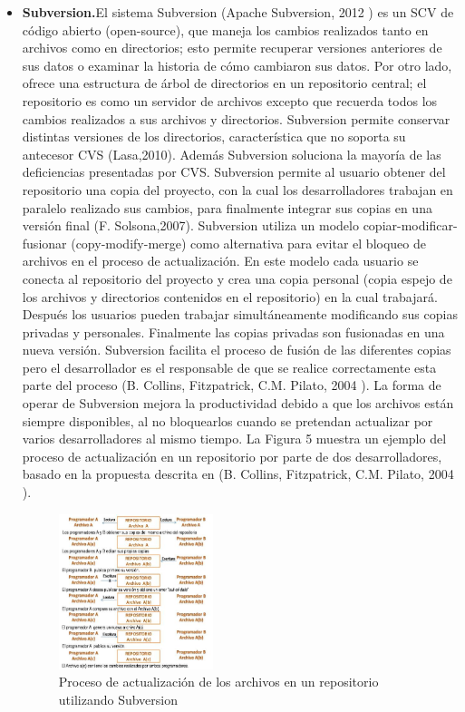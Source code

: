 \documentclass[a4paper,12pt]{article}
\begin{document}
{\begin{itemize}
\begin{figure}[h]
	\end{figure}
	
	\item \textbf{Subversion.}El sistema Subversion (Apache Subversion, 2012 ) es un SCV de código abierto (open-source), que maneja los
	cambios realizados tanto en archivos como en directorios; esto permite recuperar versiones
	anteriores de sus datos o examinar la historia de cómo cambiaron sus datos. Por otro lado, ofrece una estructura de árbol de directorios en un repositorio central; el repositorio es como un servidor de archivos excepto que recuerda todos los cambios realizados a sus archivos y directorios. Subversion permite conservar distintas versiones de
	los directorios, característica que no soporta su antecesor CVS (Lasa,2010). Además Subversion soluciona la mayoría de las deficiencias presentadas por CVS. Subversion permite al usuario obtener del repositorio una copia del proyecto, con la cual los desarrolladores trabajan en paralelo realizado sus cambios, para finalmente integrar sus copias en una versión final (F. Solsona,2007). Subversion utiliza un modelo copiar-modificar-fusionar (copy-modify-merge) como alternativa para evitar el bloqueo de archivos en el proceso de actualización. En este modelo cada usuario se conecta al repositorio del proyecto y crea una copia personal (copia espejo de los archivos y directorios contenidos en el repositorio) en la cual trabajará. Después los usuarios pueden trabajar simultáneamente modificando sus copias privadas y personales. Finalmente las copias privadas son fusionadas en una nueva versión. Subversion facilita el proceso de fusión de las diferentes copias pero el desarrollador es el responsable de que se realice correctamente esta parte del proceso (B. Collins, Fitzpatrick, C.M. Pilato,  2004 ). La forma de operar de Subversion mejora la productividad debido a que los archivos están siempre disponibles, al no bloquearlos cuando se pretendan actualizar por varios desarrolladores al mismo tiempo. La Figura 5 muestra un ejemplo del proceso de actualización en un repositorio por parte de dos desarrolladores, basado en la propuesta descrita en (B. Collins, Fitzpatrick, C.M. Pilato,  2004 ).
	
	\begin{figure}[h]
		\centering
		\begin{minipage}[t]{5.5cm}
			\includegraphics[width=4.5cm]{grafico6.png}	 %
			\caption{ Proceso de actualización de los archivos en un repositorio utilizando Subversion}
		\end{minipage}
		

\end{figure}
\end{itemize}}
\end{document}
